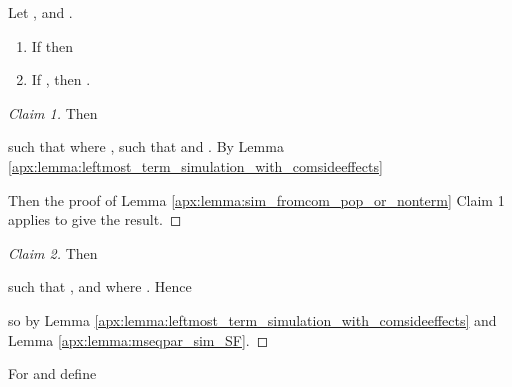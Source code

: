 \begin{lemma}\label{apx:lemma:sim_fromncom_push_or_nonterm}
Let ,  and .
\begin{enumerate}
	\item If 
	      then 
	      
	\item If , then .
\end{enumerate}
\end{lemma}
\begin{proof}[Claim 1]
Then 

such that  where 
,  such that  and . 
By Lemma \ref{apx:lemma:leftmost_term_simulation_with_comsideeffects} 

Then the proof of Lemma \ref{apx:lemma:sim_fromcom_pop_or_nonterm} Claim 1 applies to give the result.
\end{proof}
\begin{proof}[Claim 2]
Then 

such that , and  where . Hence


so by Lemma \ref{apx:lemma:leftmost_term_simulation_with_comsideeffects} and Lemma \ref{apx:lemma:mseqpar_sim_SF}.

\end{proof}

For  and  define


